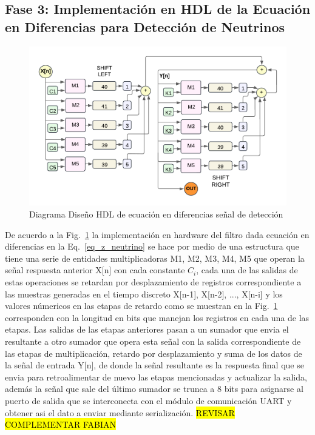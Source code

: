\documentclass[conference]{IEEEtran}
\begin{document}
{\subsection{Fase 3: Implementación en HDL de la Ecuación en Diferencias para Detección de Neutrinos}
 \begin{figure}[H]
\centerline{\includegraphics[scale=0.5]{eq_dif_vhdl_diagram.pdf}}
        \caption{Diagrama Diseño HDL de ecuación en diferencias señal de detección}
        \label{eq_dif_schematic}
        \end{figure}
        
De acuerdo a la Fig.~\ref{eq_dif_schematic} la implementación en hardware del filtro dada ecuación en diferencias en la Eq.~\ref{eq_z_neutrino} se hace por medio de una estructura que tiene una serie de entidades multiplicadoras M1, M2, M3, M4, M5 que operan la señal respuesta anterior X[n] con cada constante $C_{i}$, cada una de las salidas de estas operaciones se retardan por desplazamiento de registros correspondiente a las muestras generadas en el tiempo discreto X[n-1], X[n-2], ..., X[n-i] y los valores númericos en las etapas de retardo como se muestran en la Fig.~\ref{eq_dif_schematic} corresponden con la longitud en bits que manejan los registros en cada una de las etapas. Las salidas de las etapas anteriores pasan a un sumador que envia el resultante a otro sumador que opera esta señal con la salida correspondiente de las etapas de multiplicación, retardo por desplazamiento y suma de los datos de la señal de entrada Y[n], de donde la señal resultante es la respuesta final que se envia para retroalimentar de nuevo las etapas mencionadas y actualizar la salida, además la señal que sale del último sumador se trunca a 8 bits para asignarse al puerto de salida que se interconecta con el módulo de comunicación UART y obtener asi el dato a enviar mediante serialización. \hl{REVISAR COMPLEMENTAR FABIAN}

}
\end{document}
